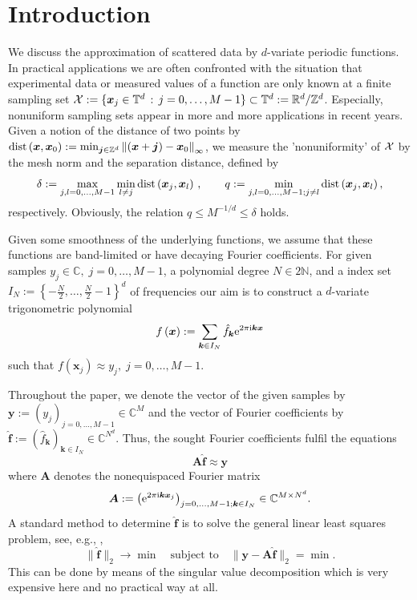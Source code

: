 \documentclass[11pt,a4paper,bibtotoc]{scrartcl}
\def\N{\mathbb{N}}
\def\R{\mathbb{R}}
\def\Z{\mathbb{Z}}
\def\C{\mathbb{C}}
\def\T{\mathbb{T}}
\def\ti{\mbox{\scriptsize{\rm i}}}
\newcommand{\eip}[1]{{\rm e}^{ 2\pi{\ti} #1}}
\newcommand{\zb}[1]{\ensuremath{\boldsymbol{#1}}}
\newcommand{\dist}{{\rm dist}}
\newcommand{\indexset}{{I_N}}
\numberwithin{equation}{section}
\numberwithin{table}{section}
\numberwithin{figure}{section}
\begin{document}
\section{Introduction}
We discuss the approximation of scattered data by $d$-variate periodic
functions. 
In practical applications we are often confronted with the situation that
experimental data or measured values of a function are only known at a finite
sampling set ${\cal X} := \{\zb x_j \in \T^d \,:\, j=0,\hdots,M-1\} \subset
\T^d:=\R^d/\Z^d$.
Especially, nonuniform sampling sets appear in more and more applications in
recent years.
Given a notion of the distance of two points by $\dist \left(\zb x,\zb
  x_0\right) := \min_{\zb j \in \mathbb Z^d} \left\| (\zb x+\zb j) - \zb
  x_0\right\|_{\infty}$, we measure the 'nonuniformity' of $\cal X$ by the
mesh norm and the separation distance, defined by
\begin{equation*}
  \delta:=\max\limits_{j,l=0,\hdots,M-1}\min\limits_{l\ne j}\dist\left(\zb
    x_j,\zb x_l\right)\,, \qquad q:=\min\limits_{j,l=0,\hdots,M-1;j\ne
    l}\dist\left(\zb x_j,\zb x_l\right),
\end{equation*}
respectively.
Obviously, the relation $q\le M^{-1/d}\le\delta$ holds.

Given some smoothness of the underlying functions, we assume that these
functions are band-limited or have decaying Fourier coefficients.
For given samples $y_j\in \mathbb{C},\; j=0,\hdots,M-1$, a polynomial degree
$N\in 2\N$, and a index set
$\indexset:=\left\{-\frac{N}{2},\hdots,\frac{N}{2}-1\right\}^d$ of frequencies
our aim is to construct a $d$-variate trigonometric polynomial
\begin{equation*}
  f\left(\zb x\right):=\sum\limits_{\zb k \in \indexset} \hat f_{\zb k}
  \eip{\zb k \zb x} 
\end{equation*}
such that  $f(\zb x_j) \approx y_j,\;j=0,\hdots,M-1$.

Throughout the paper, we denote the vector of the given samples by $\zb
y:=(y_{j})_{j=0,\ldots,M-1}\in \mathbb{C}^{M}$ and the vector of Fourier
coefficients by $\zb {\hat f}:=(\hat f_{\zb k})_{\zb k\in \indexset} \in
\mathbb{C}^{N^d}$.
Thus, the sought Fourier coefficients fulfil the equations
\begin{equation}
 \label{eq:1}
 \zb A \zb {\hat f} \approx \zb y
\end{equation}
where $\zb A$ denotes the nonequispaced Fourier matrix 
\begin{equation*}
  \zb A:=\left(\eip{\zb k \zb x_j}\right)_{j=0,\hdots,M-1;\zb k \in \indexset}
  \in \C^{M\times N^d}.
\end{equation*}
A standard method to determine $\zb {\hat f}$ is to solve the general linear
least squares problem, see, e.g., \cite[p. 15]{Bj96},
\begin{equation*}
  \|\zb {\hat f}\|_2 \rightarrow \min \quad \text{subject to} \quad
  \|\zb y - \zb A \zb {\hat f}\|_2=\min.
\end{equation*}
This can be done by means of the singular value decomposition which is very
expensive here and no practical way at all.
\end{document}
